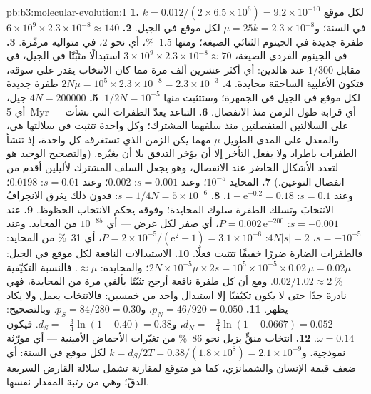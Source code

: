 \begin{solution}{pb:b3:molecular-evolution:1}
\textbf{1.} $k = 0.012/(2\times 6.5\times 10^{6}) = 9.2\times 10^{-10}$ لكل
موقع في السنة؛ و$\mu = 25k = 2.3\times 10^{-8}$ لكل موقع في الجيل.
\textbf{2.} $6\times 10^{9}\times 2.3\times 10^{-8} \approx 140$ طفرة
جديدة في الجينوم الثنائي الصيغة؛ ومنها \qty{1.5}{\%}، أي نحو $2$، في
متوالية مرمِّزة.
\textbf{3.} في الجينوم الفردي الصيغة، $3\times 10^{9}\times 2.3\times 10^{-8}
\approx 70$ استبدالًا مثبَّتًا في الجيل، في مقابل $1/300$ عند
هالدين: أي أكثر عشرين ألف مرة مما كان الانتخاب يقدر على
سوقه، فتكون الأغلبية الساحقة محايدة.
\textbf{4.} $2N\mu = 10^{5}\times 2.3\times 10^{-8} = 2.3\times 10^{-3}$
طفرة جديدة لكل موقع في الجيل في الجمهرة؛ وستتثبت منها $1/2N =
10^{-5}$.
\textbf{5.} $4N = \num{200000}$ جيل، أي \qty{5}{Myr} --- أي قرابة
طول الزمن منذ الانفصال.
\textbf{6.} التباعد يعدّ الطفرات التي نشأت على السلالتين
المنفصلتين منذ سلفهما المشترك؛ وكل واحدة تتثبت في سلالتها
هي، والمعدل على المدى الطويل $\mu$ مهما يكن الزمن الذي تستغرقه
كل واحدة، إذ تنشأ الطفرات باطراد ولا يفعل التأخر إلا أن
يؤخر التدفق بلا أن يغيّره. (والتصحيح الوحيد هو لتعدد الأشكال
الحاضر عند الانفصال، وهو يجعل السلف المشترك لأليلين أقدم من
انفصال النوعين.)
\textbf{7.} المحايد $10^{-5}$؛ وعند $s = 0.001$: $0.002$؛ وعند $s = 0.01$: $0.0198$؛
وعند $s = 0.1$: $1 - \mathrm{e}^{-0.2} = 0.18$.
\textbf{8.} $s = 1/4N = 5\times 10^{-6}$: فدون ذلك يغرق الانجرافُ
الانتخابَ وتسلك الطفرة سلوك المحايدة؛ وفوقه يحكم الانتخاب
الحظوظ.
\textbf{9.} عند $s = -0.001$: $P = 0.002\,\mathrm{e}^{-200}$، أي صفر لكل
غرض --- أي $10^{-85}$ من المحايد. وعند $s = -10^{-5}$، $4N|s| = 2$: $P =
2\times 10^{-5}/(\mathrm{e}^{2} - 1) = 3.1\times 10^{-6}$، أي \qty{31}{\%} من
المحايد: فالطفرات الضارة ضررًا خفيفًا تتثبت فعلًا.
\textbf{10.} الاستبدالات النافعة لكل موقع في الجيل: $2N\times
10^{-5}\mu\times 2s = 10^{5}\times 10^{-5}\times 0.02\,\mu = 0.02\mu$؛
والمحايدة: $\approx\mu$. فالنسبة التكيّفية $0.02/1.02 \approx \qty{2}{\%}$.
ومع أن كل طفرة نافعة أرجح تثبّتًا بألفي مرة
من المحايدة، فهي نادرة جدًا حتى لا يكون تكيّفيًا إلا استبدال
واحد من خمسين: فالانتخاب يعمل ولا يكاد يظهر.
\textbf{11.} $p_{N} = 46/920 = 0.050$، و$p_{S} = 84/280 = 0.30$. وبالتصحيح:
$d_{N} = -\tfrac{3}{4}\ln(1 - 0.0667) = 0.052$، و$d_{S} = -\tfrac{3}{4}
\ln(1 - 0.40) = 0.38$. فيكون $\omega = 0.14$.
\textbf{12.} انتخاب منقٍّ يزيل نحو \qty{86}{\%} من
تغيّرات الأحماض الأمينية --- أي مورّثة نموذجية. و$k = d_{S}/2T = 0.38/(1.8\times
10^{8}) = 2.1\times 10^{-9}$ لكل موقع في السنة: أي ضعف قيمة الإنسان
والشمبانزي، كما هو متوقع لمقارنة تشمل سلالة القارض السريعة
الدقّ؛ وهي من رتبة المقدار نفسها.

\end{solution}
